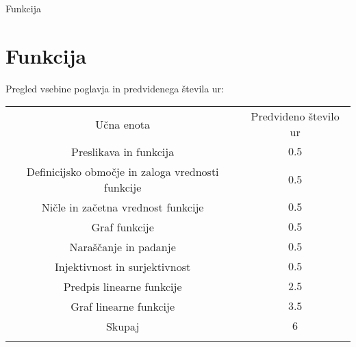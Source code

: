 \begin{priprava}{0}{}{}{Funkcija}{}{}
    
    \chapter{Funkcija}

    \Large{Pregled vsebine poglavja in predvidenega števila ur:}

    \begin{table}[H]
        \centering
        \begin{tabular}{||c|c||} 
        \hhline{|t:==:t|}
        \rowcolor[rgb]{0.843,0.718,0.718} 
        Učna enota  & Predvideno število ur   \\ 
        \hhline{|:==:|}
        Preslikava in funkcija & $0.5$    \\ 
        \hline
        Definicijsko območje in zaloga vrednosti funkcije & $0.5$    \\ 
        \hline
        Ničle in začetna vrednost funkcije & $0.5$    \\ 
        \hline
        Graf funkcije & $0.5$    \\
        \hline
        Naraščanje in padanje & $0.5$    \\
        \hline 
        Injektivnost in surjektivnost & $0.5$ \\
        \hline
        Predpis linearne funkcije & $2.5$    \\ 
        \hline
        Graf linearne funkcije & $3.5$    \\ 
        \hhline{|:==:|}
        Skupaj & $6$     \\
        \hhline{|b:==:b|}
        \end{tabular}
    \end{table}


    
\end{priprava}